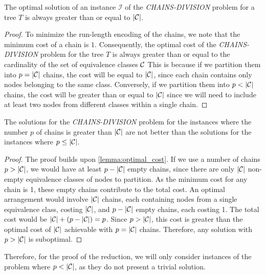 \begin{lemma} \label{lemma:optimal_cost}
    The optimal solution of an instance $\mathcal{I}$ of the \textit{CHAINS-DIVISION} problem for a tree $T$ is always greater than or equal to $|\mathcal{C}|$.
\end{lemma}

\begin{proof}
    To minimize the run-length encoding of the chains, we note that the minimum cost of a chain is $1$. Consequently, the optimal cost of the \textit{CHAINS-DIVISION} problem for the tree $T$ is always greater than or equal to the cardinality of the set of equivalence classes $\mathcal{C}$ This is because if we partition them into $p = |\mathcal{C}|$ chains, the cost will be equal to $|\mathcal{C}|$, since each chain contains only nodes belonging to the same class. Conversely, if we partition them into $p < |\mathcal{C}|$ chains, the cost will be greater than or equal to $|\mathcal{C}|$ since we will need to include at least two nodes from different classes within a single chain.
\end{proof}

\begin{claim} \label{claim:p_less_than_E}
    The solutions for the \textit{CHAINS-DIVISION} problem for the instances where the number $p$ of chains is greater than $|\mathcal{C}|$ are not better than the solutions for the instances where $p \leq |\mathcal{C}|$.
\end{claim}

\begin{proof}
    The proof builds upon \cref{lemma:optimal_cost}. If we use a number of chains $p > |\mathcal{C}|$, we would have at least $p - |\mathcal{C}|$ empty chains, since there are only $|\mathcal{C}|$ non-empty equivalence classes of nodes to partition. As the minimum cost for any chain is 1, these empty chains contribute to the total cost. An optimal arrangement would involve $|\mathcal{C}|$ chains, each containing nodes from a single equivalence class, costing $|\mathcal{C}|$, and $p - |\mathcal{C}|$ empty chains, each costing 1. The total cost would be $|\mathcal{C}| + (p - |\mathcal{C}|) = p$. Since $p > |\mathcal{C}|$, this cost is greater than the optimal cost of $|\mathcal{C}|$ achievable with $p = |\mathcal{C}|$ chains. Therefore, any solution with $p > |\mathcal{C}|$ is suboptimal.
\end{proof}

Therefore, for the proof of the reduction, we will only consider instances of the problem where $p < |\mathcal{C}|$, as they do not present a trivial solution.

